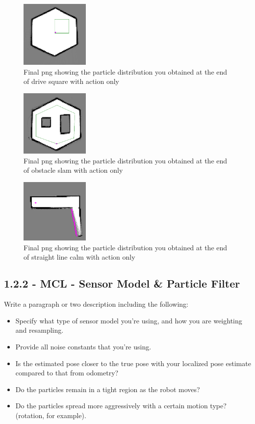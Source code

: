 \documentclass[journal,onecolumn]{IEEEtran}
\begin{document}
\begin{figure}[H]
\centering
\includegraphics[width=0.3\textwidth]{Media/1211.png}
\caption{Final png showing the particle distribution you obtained at the end of drive square with action only}
\end{figure}

\begin{figure}[H]
\centering
\includegraphics[width=0.3\textwidth]{Media/1212.png}
\caption{Final png showing the particle distribution you obtained at the end of obstacle slam with action only}
\end{figure}

\begin{figure}[H]
\centering
\includegraphics[width=0.3\textwidth]{Media/1213.png}
\caption{Final png showing the particle distribution you obtained at the end of straight line calm with action only}
\end{figure}

\subsection*{1.2.2 - MCL - Sensor Model \& Particle Filter} 

 Write a paragraph or two description including the following:
 \begin{itemize}
    \item Specify what type of sensor model you're using, and how you are weighting and resampling.
    \item Provide all noise constants that you're using.
    \item Is the estimated pose closer to the true pose with your localized pose estimate compared to that from odometry?
    \item Do the particles remain in a tight region as the robot moves?
    \item Do the particles spread more aggressively with a certain motion type? (rotation, for example).
\end{itemize}
\end{document}
